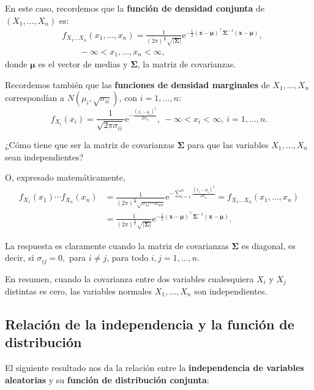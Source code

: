 \documentclass[]{book}
\begin{document}
En este caso, recordemos que la \textbf{función de densidad conjunta} de \((X_1,\ldots,X_n)\) es:
\[
\begin{array}{rl}
& f_{X_1\ldots X_n}(x_1,\ldots,x_n)=\frac{1}{(2\pi)^{\frac{n}{2}}\sqrt{\mathbf{|\Sigma|}}}\mathrm{e}^{-\frac{1}{2}(\mathbf{x-\mu})^\top\mathbf{\Sigma}^{-1}(\mathbf{x-\mu})},\\ & \qquad  -\infty <x_1,\ldots,x_n<\infty,
\end{array}
\]
donde \(\mathbf{\mu}\) es el vector de medias y \(\mathbf{\Sigma}\), la matriz de covarianzas.

Recordemos también que las \textbf{funciones de densidad marginales} de \(X_1,\ldots, X_n\) correspondían a \(N(\mu_i,\sqrt{\sigma_{ii}})\), con \(i=1,\ldots, n\):
\[
f_{X_i}(x_i)  =\frac{1}{\sqrt{2\pi\sigma_{ii}}}\mathrm{e}^{-\frac{(x_i-\mu_i)^2}{2\sigma_{ii}}},\ -\infty <x_i<\infty,\ i=1,\ldots,n.
\]

¿Cómo tiene que ser la matriz de covarianzas \(\mathbf{\Sigma}\) para que las variables \(X_1,\ldots,X_n\) sean independientes?

O, expresado matemáticamente,
\[
\begin{array}{rl}
f_{X_1}(x_1)\cdots f_{X_n}(x_n) & =\frac{1}{\left(2\pi\right)^{\frac{n}{2}}\sqrt{\sigma_{11}\cdots \sigma_{nn}}}\mathrm{e}^{-\sum\limits_{i=1}^n\frac{(x_i-\mu_i)^2}{2\sigma_{ii}}}=f_{X_1\ldots X_n}(x_1,\ldots,x_n) \\ & =\frac{1}{(2\pi)^{\frac{n}{2}}\sqrt{\mathbf{|\Sigma|}}}\mathrm{e}^{-\frac{1}{2}(\mathbf{x-\mu})^\top\mathbf{\Sigma}^{-1}(\mathbf{x-\mu})}.
\end{array}
\]

La respuesta es claramente cuando la matriz de covarianzas \(\mathbf{\Sigma}\) es diagonal, es decir, si \(\sigma_{ij}=0,\) para \(i\neq j\), para todo \(i,j=1,\ldots,n\).

En resumen, cuando la covarianza entre dos variables cualesquiera \(X_i\) y \(X_j\) distintas es cero, las variables normales \(X_1,\ldots,X_n\) son independientes.

\hypertarget{relaciuxf3n-de-la-independencia-y-la-funciuxf3n-de-distribuciuxf3n-1}{%
\subsection{Relación de la independencia y la función de distribución}\label{relaciuxf3n-de-la-independencia-y-la-funciuxf3n-de-distribuciuxf3n-1}}

El siguiente resultado nos da la relación entre la \textbf{independencia de variables aleatorias} y su \textbf{función de distribución conjunta}:
\end{document}
